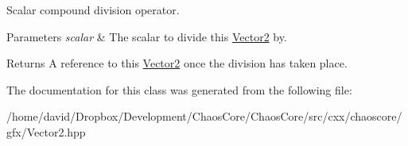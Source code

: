 Scalar compound division operator. 


\begin{DoxyParams}{Parameters}
{\em scalar} & The scalar to divide this \hyperlink{classchaos_1_1gfx_1_1_vector2}{Vector2} by. \\
\hline
\end{DoxyParams}
\begin{DoxyReturn}{Returns}
A reference to this \hyperlink{classchaos_1_1gfx_1_1_vector2}{Vector2} once the division has taken place. 
\end{DoxyReturn}


The documentation for this class was generated from the following file\-:\begin{DoxyCompactItemize}
\item 
/home/david/\-Dropbox/\-Development/\-Chaos\-Core/\-Chaos\-Core/src/cxx/chaoscore/gfx/Vector2.\-hpp\end{DoxyCompactItemize}
